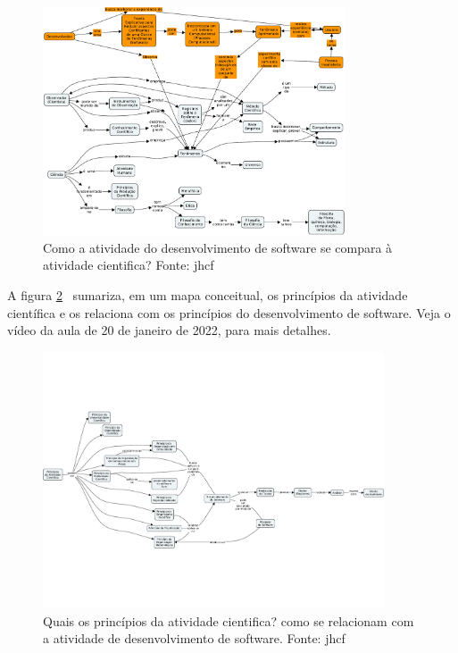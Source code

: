 \begin{figure}[ht]
    \centering
    \includegraphics[page=1,angle=90,width=0.8\textwidth,height=0.9\textheight]{1-Introducao/aulas/Desenvolvimento-de-Software-Ciencia-e-Filosofia.pdf}
    \caption{Como a atividade do desenvolvimento de software se compara à atividade cientifica? Fonte: jhcf}
    \label{fig:desenv-sw-ciencia-filosofia}
\end{figure}

A figura \ref{fig:principios:ativ:cientifica}~ sumariza, em um mapa conceitual, os princípios da atividade científica e os relaciona com os princípios do desenvolvimento de software.
Veja o vídeo da aula de 20 de janeiro de 2022, para mais detalhes.

\begin{figure}[ht]
    \centering
    \includegraphics[page=1,angle=90,width=0.9\textwidth,height=0.9\textheight]{1-Introducao/aulas/Principios-da-atividade-cientifica.pdf}
    \caption{Quais os princípios da  atividade cientifica? como se relacionam com a atividade de desenvolvimento de software. Fonte: jhcf}
    \label{fig:principios:ativ:cientifica}
\end{figure}
